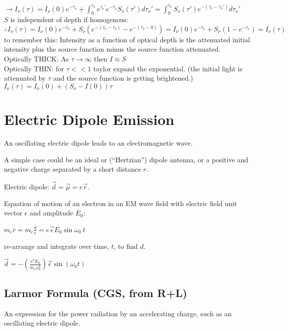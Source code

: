 \documentclass[12pt]{report}
\begin{document}
\(\rightarrow I_\nu(\tau) =   I_\nu(0)e^{-\tau_\nu}  +   \int_0^{\tau_\nu} e^{\tau_\nu'}e^{-\tau_\nu}S_\nu(\tau') d\tau_\nu' =\int_0^{\tau_\nu} S_\nu(\tau')  e^{-(\tau_\nu-\tau_\nu')}d\tau_\nu'\) \\
$S$ is independent of depth if homogenous:\\
\( \therefore  I_\nu(\tau) =  I_\nu(0)e^{-\tau_\nu} + S_\nu (e^{-(\tau_\nu-\tau_\nu)}-e^{-(\tau_\nu-0)})=\boxed{ I_\nu(0)e^{-\tau_\nu}  +S_\nu (1-e^{-\tau_\nu}) =I_\nu(\tau) }\)
to remember this: Intensity as a function of optical depth is the attenuated initial intensity plus the source function minus the source function attenuated.\\
Optically THICK: As $\tau\rightarrow \infty$ then $I\approx S$\\
Optically THIN: for $\tau<<1$ taylor expand the exponential.  (the initial light is attenuated by $\tau$ and the source function is getting brightened.)\\
$I_\nu(\tau)=I_\nu(0)+(S_\nu-I(0))\tau$


 
 \section{Electric Dipole Emission}
 
 An oscillating electric dipole leads to an electromagnetic wave. 
 
 A simple case could be an ideal or (``Hertzian'') dipole antenna, or a positive and negative charge separated by a short distance $r$. 
 
 Electric dipole:  $\vec{d}=\vec{\mu}=e\vec{r}$.
 
 Equation of motion of an electron in an EM wave field with electric field unit vector $\epsilon$ and amplitude $E_0$:
 
 $m_e\ddot{r}=m_e\frac{\ddot{d}}{e}=e\vec{\epsilon}E_0\sin{\omega_0 \ t}$
 
 re-arrange and integrate over time, $t$, to find $d$.
 
 $\vec{d}=-(\frac{e^2E_0}{m_e \omega_0^2})\vec{\epsilon}\sin(\omega_0 t)$
 

\subsection{Larmor Formula (CGS, from R+L)}
An expression for the power radiation by an accelerating charge, such as an oscillating electric dipole.
\end{document}
